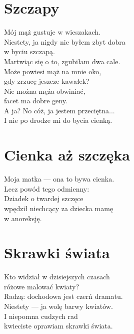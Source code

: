 \documentclass[12pt, a4paper]{memoir}
\renewenvironment{verse}{%
  \par\vspace{\baselineskip}\raggedright
}{
  \par\vspace{\baselineskip}
}
\begin{document}
\clearpage

\section{Szczapy}

\begin{verse}
Mój mąż gustuje w wieszakach.\\
Niestety, ja nigdy nie byłem zbyt dobra\\
w byciu szczapą.\\[\baselineskip]

Martwiąc się o to, zgubiłam dwa cale.\\
Może powiesi mąż na mnie oko,\\
gdy zrzucę jeszcze kawałek?\\[\baselineskip]

Nie można męża obwiniać,\\
facet ma dobre geny.\\
A ja? No cóż, ja jestem przeciętna...\\
I nie po drodze mi do bycia cienką.
\end{verse}

\clearpage

\section{Cienka aż szczęka}

\begin{verse}
Moja matka --- ona to bywa cienka.\\
Lecz powód tego odmienny:\\
Dziadek o twardej szczęce\\
wpędził niechcący za dziecka mamę\\
w anoreksję.
\end{verse}

\clearpage

\section{Skrawki świata}

\begin{verse}
Kto widział w dzisiejszych czasach\\
różowe malować kwiaty?\\
Radzą: dochodowa jest czerń dramatu.\\[\baselineskip]

Niestety --- ja wolę barwy kwiatów.\\
I niepomna cudzych rad\\
kwieciste oprawiam skrawki świata.
\end{verse}
\end{document}

